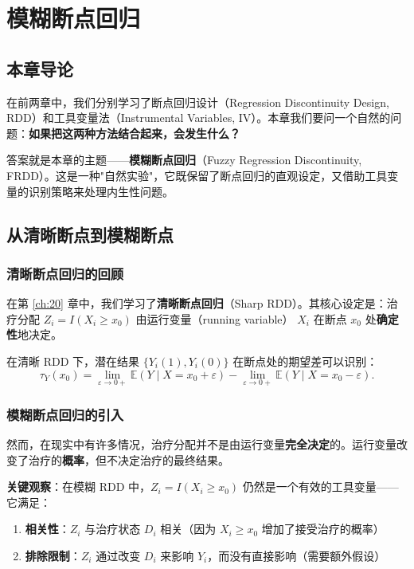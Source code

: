 
\chapter{模糊断点回归}\label{ch:24}

\section{本章导论}

在前两章中，我们分别学习了断点回归设计（Regression Discontinuity Design, RDD）和工具变量法（Instrumental Variables, IV）。本章我们要问一个自然的问题：\textbf{如果把这两种方法结合起来，会发生什么？}

答案就是本章的主题——\textbf{模糊断点回归}（Fuzzy Regression Discontinuity, FRDD）。这是一种"自然实验"，它既保留了断点回归的直观设定，又借助工具变量的识别策略来处理内生性问题。

\section{从清晰断点到模糊断点}

\subsection{清晰断点回归的回顾}

在第 \ref{ch:20} 章中，我们学习了\textbf{清晰断点回归}（Sharp RDD）。其核心设定是：治疗分配 $Z_i = I(X_i \geq x_0)$ 由运行变量（running variable） $X_i$ 在断点 $x_0$ 处\textbf{确定性}地决定。

在清晰 RDD 下，潜在结果 $\{Y_i(1), Y_i(0)\}$ 在断点处的期望差可以识别：
\begin{equation}
\tau_Y(x_0) = \lim_{\varepsilon \to 0+} \mathbb{E}(Y \mid X = x_0 + \varepsilon) - \lim_{\varepsilon \to 0+} \mathbb{E}(Y \mid X = x_0 - \varepsilon).
\label{eq:24-sharp-rdd}
\end{equation}

\subsection{模糊断点回归的引入}

然而，在现实中有许多情况，治疗分配并不是由运行变量\textbf{完全决定}的。运行变量改变了治疗的\textbf{概率}，但不决定治疗的最终结果。

\textbf{关键观察}：在模糊 RDD 中，$Z_i = I(X_i \geq x_0)$ 仍然是一个有效的工具变量——它满足：
\begin{enumerate}
  \item \textbf{相关性}：$Z_i$ 与治疗状态 $D_i$ 相关（因为 $X_i \geq x_0$ 增加了接受治疗的概率）
  \item \textbf{排除限制}：$Z_i$ 通过改变 $D_i$ 来影响 $Y_i$，而没有直接影响（需要额外假设）
\end{enumerate}

